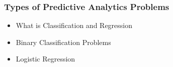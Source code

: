 \documentclass[PredictiveAnalytics101.tex]{subfiles}
\begin{document}
 



\begin{frame}
\frametitle{Types of Predictive Analytics Problems}
\begin{itemize}
\item What is Classification and Regression
\item Binary Classification Problems
\item Logistic Regression
\end{itemize}



\end{frame}
\end{document}
